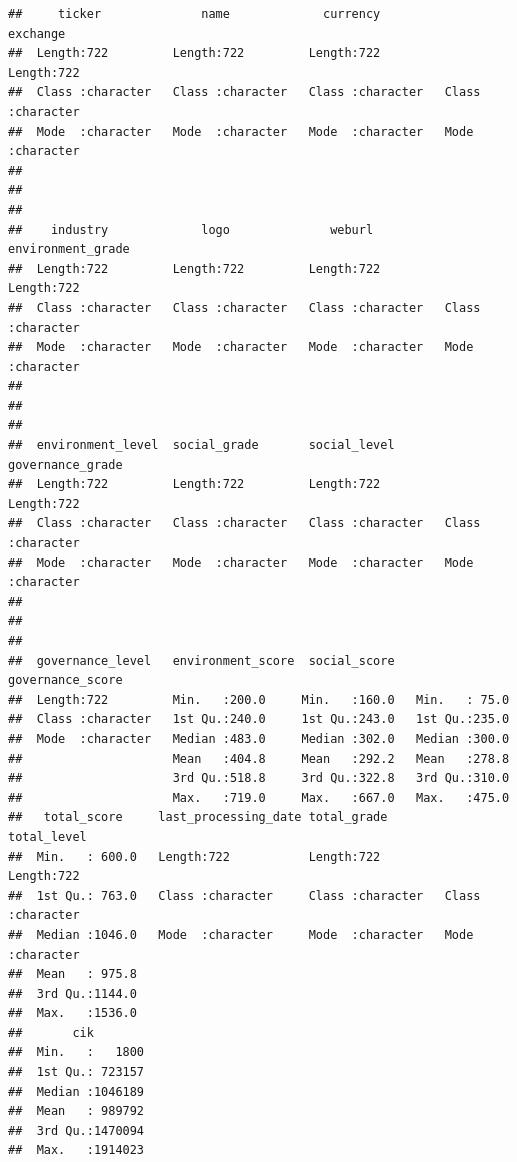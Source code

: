 \documentclass[
]{article}
\begin{document}
\begin{verbatim}
##     ticker              name             currency           exchange        
##  Length:722         Length:722         Length:722         Length:722        
##  Class :character   Class :character   Class :character   Class :character  
##  Mode  :character   Mode  :character   Mode  :character   Mode  :character  
##                                                                             
##                                                                             
##                                                                             
##    industry             logo              weburl          environment_grade 
##  Length:722         Length:722         Length:722         Length:722        
##  Class :character   Class :character   Class :character   Class :character  
##  Mode  :character   Mode  :character   Mode  :character   Mode  :character  
##                                                                             
##                                                                             
##                                                                             
##  environment_level  social_grade       social_level       governance_grade  
##  Length:722         Length:722         Length:722         Length:722        
##  Class :character   Class :character   Class :character   Class :character  
##  Mode  :character   Mode  :character   Mode  :character   Mode  :character  
##                                                                             
##                                                                             
##                                                                             
##  governance_level   environment_score  social_score   governance_score
##  Length:722         Min.   :200.0     Min.   :160.0   Min.   : 75.0   
##  Class :character   1st Qu.:240.0     1st Qu.:243.0   1st Qu.:235.0   
##  Mode  :character   Median :483.0     Median :302.0   Median :300.0   
##                     Mean   :404.8     Mean   :292.2   Mean   :278.8   
##                     3rd Qu.:518.8     3rd Qu.:322.8   3rd Qu.:310.0   
##                     Max.   :719.0     Max.   :667.0   Max.   :475.0   
##   total_score     last_processing_date total_grade        total_level       
##  Min.   : 600.0   Length:722           Length:722         Length:722        
##  1st Qu.: 763.0   Class :character     Class :character   Class :character  
##  Median :1046.0   Mode  :character     Mode  :character   Mode  :character  
##  Mean   : 975.8                                                             
##  3rd Qu.:1144.0                                                             
##  Max.   :1536.0                                                             
##       cik         
##  Min.   :   1800  
##  1st Qu.: 723157  
##  Median :1046189  
##  Mean   : 989792  
##  3rd Qu.:1470094  
##  Max.   :1914023
\end{verbatim}
\end{document}
